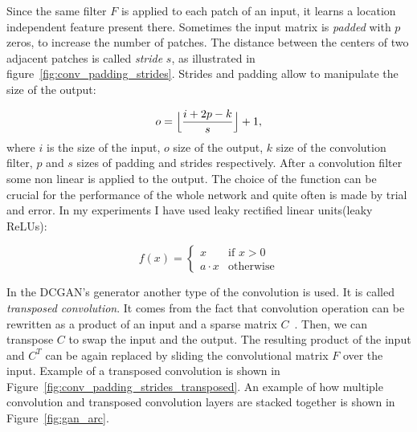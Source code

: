 Since the same filter $F$ is applied to each patch of an input, it learns a location independent feature present there. Sometimes the input matrix is \textit{padded} with $p$ zeros, to increase the number of patches. The distance between the centers of two adjacent patches is called \textit{stride} $s$, as illustrated in figure~\ref{fig:conv_padding_strides}. Strides and padding allow to manipulate the size of the output:

\begin{equation}
	o = \Bigl\lfloor \frac{i + 2p - k}{s} \Bigr\rfloor + 1,
\end{equation}
where $i$ is the size of the input, $o$ size of the output, $k$ size of the convolution filter, $p$ and $s$ sizes of padding and strides respectively. After a convolution filter some non linear is applied to the output. The choice of the function can be crucial for the performance of the whole network and quite often is made by trial and error. In my experiments I have used leaky rectified linear units(leaky ReLUs): 

\begin{equation}
	f(x) = \begin{cases}
			x & \text{if }x > 0\\
			a \cdot x &\text{otherwise}
			\end{cases}	
\end{equation}

In the DCGAN's generator another type of the convolution is used. It is called \textit{transposed convolution}. It comes from the fact that convolution operation can be rewritten as a product of an input and a sparse matrix $C$~\cite{conv_tutorial}. Then, we can transpose $C$ to swap the input and the output. The resulting product of the input and $C^T$ can be again replaced by sliding the convolutional matrix $F$ over the input. Example of a transposed convolution is shown in Figure~\ref{fig:conv_padding_strides_transposed}. An example of how multiple convolution and transposed convolution layers are stacked together is shown in Figure~\ref{fig:gan_arc}.

